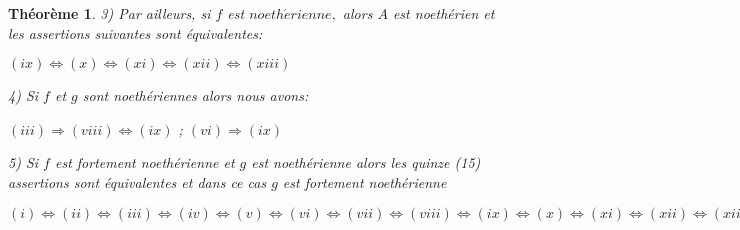 \documentclass[12pt, a4paper, oneside]{article}
\newtheorem{montheoreme}{Théorème}
\begin{document}
\begin{montheoreme}
		3) Par ailleurs, si $f$ est $noeth\acute{e}rienne,$ alors $A$ est noethérien et les assertions suivantes sont équivalentes:
		
		$(ix)\Longleftrightarrow (x)\Longleftrightarrow (xi)\Longleftrightarrow
		(xii)\Longleftrightarrow (xiii)$
		
		4) Si $f$ et $g$ sont noethériennes alors nous avons:
		
		$(iii)\Longrightarrow (viii)\Longleftrightarrow (ix)$ ; $(vi)\Longrightarrow (ix)$
		
		5) Si $f$ est fortement noethérienne et $g$ est noethérienne alors les quinze (15) assertions sont équivalentes et dans ce cas $g$ est fortement noethérienne
		
		$(i)\Longleftrightarrow (ii)\Longleftrightarrow (iii)\Longleftrightarrow
		(iv)\Longleftrightarrow (v)\Longleftrightarrow (vi)\Longleftrightarrow
		(vii)\Longleftrightarrow (viii)\Longleftrightarrow (ix)\Longleftrightarrow
		(x)\Longleftrightarrow (xi)\Longleftrightarrow (xii)\Longleftrightarrow
		(xiii)\Longleftrightarrow (xiv)\Longleftrightarrow (xv).$
	\end{montheoreme}
\end{document}
